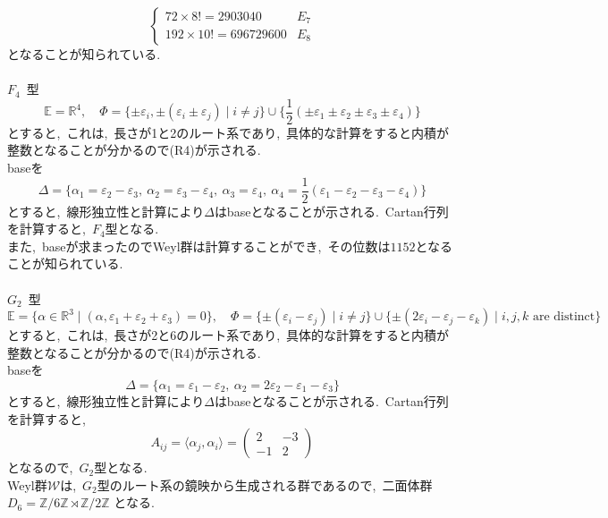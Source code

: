 \documentclass[uplatex,dvipdfmx]{jsarticle}
\begin{document}
\begin{myproof}
\begin{equation*}
\begin{cases}
            72 \times 8! = 2903040 & E_7 \\
            192 \times 10! = 696729600 & E_8
        \end{cases}
    \end{equation*}
    となることが知られている.\\\\
    $F_4$~型\\
    \begin{equation*}
        \mathbb{E} = \mathbb{R}^4, \quad \Phi = \{\pm \varepsilon_i, \pm (\varepsilon_i \pm \varepsilon_j) \mid i \neq j\} \cup \{\frac{1}{2}(\pm \varepsilon_1 \pm \varepsilon_2 \pm \varepsilon_3 \pm \varepsilon_4)\}
    \end{equation*}
    とすると,~これは,~長さが1と2のルート系であり,~具体的な計算をすると内積が整数となることが分かるので(R4)が示される.~\\
    baseを
    \begin{equation*}
        \Delta = \{\alpha_1 = \varepsilon_2 - \varepsilon_3,~\alpha_2 = \varepsilon_3 - \varepsilon_4,~\alpha_3 = \varepsilon_4,~\alpha_4 = \frac{1}{2}(\varepsilon_1 - \varepsilon_2 - \varepsilon_3 - \varepsilon_4)\}
    \end{equation*}
    とすると,~線形独立性と計算により$\Delta$はbaseとなることが示される.~Cartan行列を計算すると,~$F_4$型となる.~\\
    また,~baseが求まったのでWeyl群は計算することができ,~その位数は$1152$となることが知られている.\\\\
    $G_2$~型\\
    \begin{equation*}
        \mathbb{E} = \{ \alpha \in \mathbb{R}^3 \mid (\alpha, \varepsilon_1 + \varepsilon_2 + \varepsilon_3) = 0 \} , \quad \Phi = \{\pm (\varepsilon_i - \varepsilon_j) \mid i \neq j\} \cup \{\pm (2\varepsilon_i - \varepsilon_j - \varepsilon_k) \mid i, j, k \text{ are distinct}\}
    \end{equation*}
    とすると,~これは,~長さが2と6のルート系であり,~具体的な計算をすると内積が整数となることが分かるので(R4)が示される.~\\
    baseを
    \begin{equation*}
        \Delta = \{\alpha_1 = \varepsilon_1 - \varepsilon_2,~\alpha_2 = 2\varepsilon_2 - \varepsilon_1 - \varepsilon_3\}
    \end{equation*}
    とすると,~線形独立性と計算により$\Delta$はbaseとなることが示される.~Cartan行列を計算すると,~
    \begin{equation*}
        A_{ij} = \langle \alpha_j, \alpha_i \rangle = \begin{pmatrix}
            2 & -3 \\
            -1 & 2
        \end{pmatrix}
    \end{equation*}
    となるので,~$G_2$型となる.~\\
    Weyl群$\mathscr{W}$は,~$G_2$型のルート系の鏡映から生成される群であるので,~二面体群$D_6 = \mathbb{Z}/6\mathbb{Z} \rtimes \mathbb{Z}/2\mathbb{Z}$ となる.
\end{myproof}
\newpage
\end{document}
